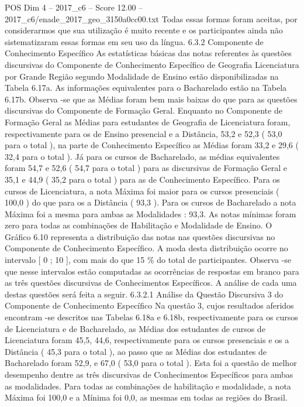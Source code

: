 \begin{textsample}{POS Dim 4 – 2017\_c6 – Score 12.00 – 2017\_c6/enade\_2017\_geo\_3150a0cc00.txt}
Todas essas formas foram aceitas, por considerarmos que sua utilização é muito recente e os participantes ainda não sistematizaram essas formas em seu uso da língua. 6.3.2 Componente de Conhecimento Específico As estatísticas básicas das notas referentes às questões discursivas do Componente de Conhecimento Específico de Geografia Licenciatura por Grande Região segundo Modalidade de Ensino estão disponibilizadas na Tabela 6.17a.
As informações equivalentes para o Bacharelado estão na Tabela 6.17b.
Observa -se que as Médias foram bem mais baixas do que para as questões discursivas do Componente de Formação Geral.
Enquanto no Componente de Formação Geral as Médias para estudantes de Geografia de Licenciatura foram, respectivamente para os de Ensino presencial e a Distância, 53,2 e 52,3 ( 53,0 para o total ), na parte de Conhecimento Específico as Médias foram 33,2 e 29,6 ( 32,4 para o total ).
Já para os cursos de Bacharelado, as médias equivalentes foram 54,7 e 52,6 ( 54,7 para o total ) para as discursivas de Formação Geral e 35,1 e 44,9 ( 35,2 para o total ) para as de Conhecimento Específico.
Para os cursos de Licenciatura, a nota Máxima foi maior para os cursos presenciais ( 100,0 ) do que para os a Distância ( 93,3 ).
Para os cursos de Bacharelado a nota Máxima foi a mesma para ambas as Modalidades : 93,3.
As notas mínimas foram zero para todas as combinações de Habilitação e Modalidade de Ensino.
O Gráfico 6.10 representa a distribuição das notas nas questões discursivas no Componente de Conhecimento Específico.
A moda desta distribuição ocorre no intervalo [ 0 ; 10 ], com mais do que 15 \% do total de participantes.
Observa -se que nesse intervalos estão computadas as ocorrências de respostas em branco para as três questões discursivas de Conhecimentos Específicos.
A análise de cada uma destas questões será feita a seguir. 6.3.2.1 Análise da Questão Discursiva 3 do Componente de Conhecimento Específico Na questão 3, cujos resultados aferidos encontram -se descritos nas Tabelas 6.18a e 6.18b, respectivamente para os cursos de Licenciatura e de Bacharelado, as Médias dos estudantes de cursos de Licenciatura foram 45,5, 44,6, respectivamente para os cursos presenciais e os a Distância ( 45,3 para o total ), ao passo que as Médias dos estudantes de Bacharelado foram 52,9, e 67,0 ( 53,0 para o total ).
Esta foi a questão de melhor desempenho dentre as três discursivas de Conhecimentos Específicos para ambas as modalidades.
Para todas as combinações de habilitação e modalidade, a nota Máxima foi 100,0 e a Mínima foi 0,0, as mesmas em todas as regiões do Brasil.

\end{textsample}
